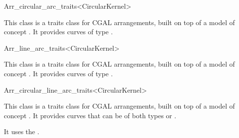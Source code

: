 \begin{ccRefClass}{Arr_circular_arc_traits<CircularKernel>}

\ccDefinition

This class is a traits class for CGAL arrangements, built on top of a model of 
concept .
It provides curves of type .


\ccIsModel
{}

\end{ccRefClass}
\begin{ccRefClass}{Arr_line_arc_traits<CircularKernel>}

\ccDefinition

This class is a traits class for CGAL arrangements, built on top of  a model of 
concept . 
It provides curves of type . 


\ccIsModel
{}

\end{ccRefClass}
\begin{ccRefClass}{Arr_circular_line_arc_traits<CircularKernel>}

\ccDefinition

This class is a traits class for CGAL arrangements, built on top of  a model of 
concept . 
It provides curves that can be of both types 
 or 
.

It uses the . 


\ccIsModel
{}

\end{ccRefClass}
